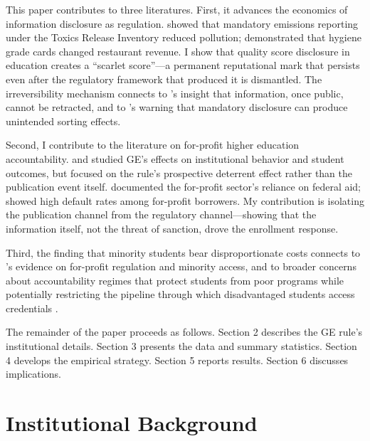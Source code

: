 \documentclass[12pt]{article}
\begin{document}
This paper contributes to three literatures. First, it advances the economics of information disclosure as regulation. \citet{greenstone2002impact} showed that mandatory emissions reporting under the Toxics Release Inventory reduced pollution; \citet{jin2003price} demonstrated that hygiene grade cards changed restaurant revenue. I show that quality score disclosure in education creates a ``scarlet score''---a permanent reputational mark that persists even after the regulatory framework that produced it is dismantled. The irreversibility mechanism connects to \citet{stigler1961economics}'s insight that information, once public, cannot be retracted, and to \citet{dranove2003there}'s warning that mandatory disclosure can produce unintended sorting effects.

Second, I contribute to the literature on for-profit higher education accountability. \citet{cellini2019gainful} and \citet{cellini2020gainful} studied GE's effects on institutional behavior and student outcomes, but focused on the rule's prospective deterrent effect rather than the publication event itself. \citet{deming2012for} documented the for-profit sector's reliance on federal aid; \citet{looney2015consequences} showed high default rates among for-profit borrowers. My contribution is isolating the publication channel from the regulatory channel---showing that the information itself, not the threat of sanction, drove the enrollment response.

Third, the finding that minority students bear disproportionate costs connects to \citet{cellini2020gainful}'s evidence on for-profit regulation and minority access, and to broader concerns about accountability regimes that protect students from poor programs while potentially restricting the pipeline through which disadvantaged students access credentials \citep{darolia2015do, akers2019game}.

The remainder of the paper proceeds as follows. Section 2 describes the GE rule's institutional details. Section 3 presents the data and summary statistics. Section 4 develops the empirical strategy. Section 5 reports results. Section 6 discusses implications.

\section{Institutional Background}
\end{document}
